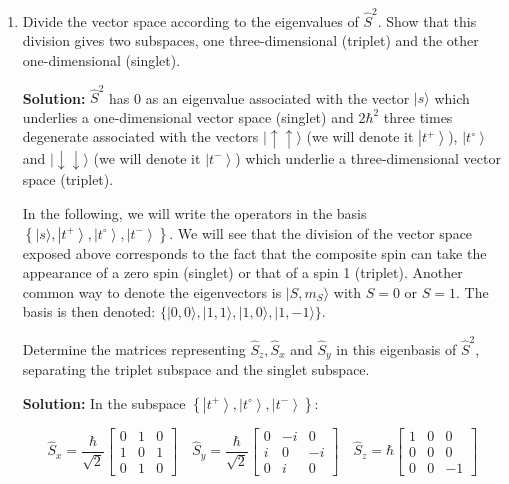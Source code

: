 \documentclass{article}
\begin{document}
\begin{enumerate}
\begin{enumerate}
        \item Divide the vector space according to the eigenvalues of \(\hat{S}^{2}\). Show that this division gives two subspaces, one three-dimensional (triplet) and the other one-dimensional (singlet).

        {\color{red}\textbf{Solution:} \(\hat{S}^{2}\) has 0 as an eigenvalue associated with the vector \(|s\rangle\) which underlies a one-dimensional vector space (singlet) and \(2 \hbar^{2}\) three times degenerate associated with the vectors \(|\uparrow \uparrow\rangle\) (we will denote it \(\left|t^{+}\right\rangle\)), \(\left|t^{\circ}\right\rangle\) and \(|\downarrow \downarrow\rangle\) (we will denote it \(\left|t^{-}\right\rangle\)) which underlie a three-dimensional vector space (triplet).

        In the following, we will write the operators in the basis \(\left\{|s\rangle, \left|t^{+}\right\rangle, \left|t^{\circ}\right\rangle, \left|t^{-}\right\rangle\right\}\). We will see that the division of the vector space exposed above corresponds to the fact that the composite spin can take the appearance of a zero spin (singlet) or that of a spin 1 (triplet). Another common way to denote the eigenvectors is \(|S, m_{S}\rangle\) with \(S = 0\) or \(S = 1\). The basis is then denoted: \(\{|0, 0\rangle, |1, 1\rangle, |1, 0\rangle, |1, -1\rangle\}\).

        Determine the matrices representing \(\hat{S}_{z}, \hat{S}_{x}\) and \(\hat{S}_{y}\) in this eigenbasis of \(\hat{S}^{2}\), separating the triplet subspace and the singlet subspace.

        \textbf{Solution:} In the subspace \(\left\{\left|t^{+}\right\rangle, \left|t^{\circ}\right\rangle, \left|t^{-}\right\rangle\right\}\):

        \[
        \hat{S}_{x} = \frac{\hbar}{\sqrt{2}} \left[\begin{array}{ccc}
        0 & 1 & 0 \\
        1 & 0 & 1 \\
        0 & 1 & 0
        \end{array}\right] \quad \hat{S}_{y} = \frac{\hbar}{\sqrt{2}} \left[\begin{array}{ccc}
        0 & -i & 0 \\
        i & 0 & -i \\
        0 & i & 0
        \end{array}\right] \quad \hat{S}_{z} = \hbar \left[\begin{array}{ccc}
        1 & 0 & 0 \\
        0 & 0 & 0 \\
        0 & 0 & -1
        \end{array}\right]
        \]

}
\end{enumerate}
\end{enumerate}
\end{document}
